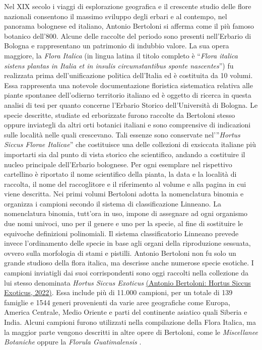 \documentclass[main.tex]{subfiles}
\begin{document}
Nel XIX secolo i viaggi di esplorazione geografica e il crescente studio delle flore nazionali consentono il massimo sviluppo degli erbari e al contempo, nel panorama bolognese ed italiano, Antonio Bertoloni si afferma come il più famoso botanico dell’800. Alcune delle raccolte del periodo sono presenti nell’Erbario di Bologna e rappresentano un patrimonio di indubbio valore.
La sua opera maggiore, la \textit{Flora Italica} \citep{moscri} (in lingua latina il titolo completo è “\textit{Flora italica sistens plantas in Italia et in insulis circumstantibus sponte nascentes}”) fu realizzata prima dell’unificazione politica dell’Italia ed è costituita da 10 volumi. Essa rappresenta una notevole documentazione floristica sistematica relativa alle piante spontanee dell’odierno territorio italiano ed è oggetto di ricerca in questa analisi di tesi per quanto concerne l’Erbario Storico dell’Università di Bologna. Le specie descritte, studiate ed erborizzate furono raccolte da Bertoloni stesso oppure inviategli da altri orti botanici italiani e sono comprensive di indicazioni sulle località nelle quali crescevano. Tali essenze sono conservate nel’”\textit{Hortus Siccus Florae Italicae}” che costituisce una delle collezioni di exsiccata italiane più importarti sia dal punto di vista storico che scientifico, andando a costituire il nucleo principale dell’Erbario bolognese. Per ogni esemplare nel rispettivo cartellino è riportato il nome scientifico della pianta, la data e la località di raccolta, il nome del raccoglitore e il riferimento al volume e alla pagina in cui viene descritta.
Nei primi volumi Bertoloni adotta la nomenclatura binomia e organizza i campioni secondo il sistema di classificazione Linneano. La nomenclatura binomia, tutt’ora in uso, impone di assegnare ad ogni organismo due nomi univoci, uno per il genere e uno per la specie, al fine di sostituire le equivoche definizioni polinomiali. Il sistema classificatorio Linneano prevede invece l’ordinamento delle specie in base agli organi della riproduzione sessuata, ovvero sulla morfologia di stami e pistilli.
Antonio Bertoloni non fu solo un grande studioso della flora italica, ma descrisse anche numerose specie esotiche. I campioni inviatigli dai suoi corrispondenti sono oggi raccolti nella collezione da lui stesso denominata \textit{Hortus Siccus Exoticus} \href{https://sma.unibo.it/it/il-sistema-museale/orto-botanico-ed-erbario/collezioni/antonio-bertoloni-hortus-siccus-exoticus-erbario}{(Antonio Bertoloni: Hortus Siccus Exoticus, 2022)}. Essa include più di 11.000 campioni, per un totale di 139 famiglie e 1544 generi provenienti da varie aree geografiche come Europa, America Centrale, Medio Oriente e parti del continente asiatico quali Siberia e India. Alcuni campioni furono utilizzati nella compilazione della Flora Italica, ma la maggior parte vengono descritti in altre opere di Bertoloni, come le \textit{Miscellanee Botaniche} oppure la \textit{Florula Guatimalensis} \citep{band}.
\end{document}
